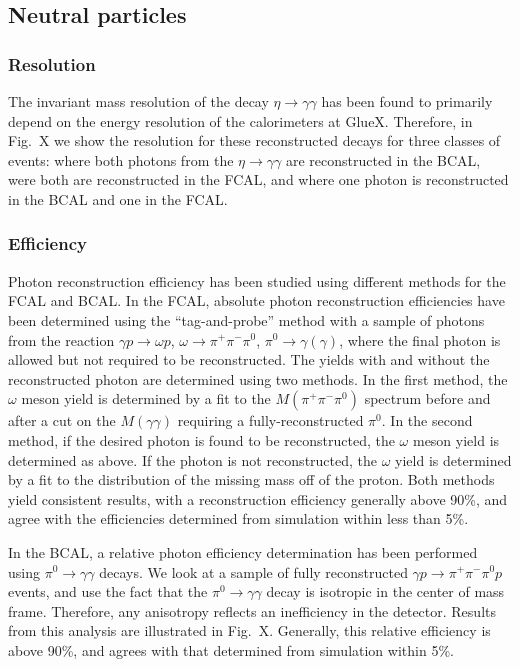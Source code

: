 \subsection{Neutral particles \label{sec:perfneutral}}

\subsubsection{Resolution \label{sec:perfneutralresol}}

The invariant mass resolution of the decay $\eta \to \gamma \gamma$ has been found to primarily depend on the energy resolution of the calorimeters at GlueX.  Therefore, in Fig.~X we show the resolution for these reconstructed decays for three classes of events: where both photons from the  $\eta \to \gamma \gamma$ are reconstructed in the BCAL, were both are reconstructed in the FCAL, and where one photon is reconstructed in the BCAL and one in the FCAL.

\subsubsection{Efficiency \label{sec:perfneutraleff}}

Photon reconstruction efficiency has been studied using different methods for the FCAL and BCAL.  In the FCAL, absolute photon reconstruction efficiencies have been determined using the ``tag-and-probe'' method with a sample of photons from the reaction $\gamma p \to \omega p$, $\omega \to \pi^+\pi^-\pi^0$, $\pi^0 \to \gamma (\gamma)$, where the final photon is allowed but not required to be reconstructed.  The yields with and without the reconstructed photon are determined using two methods.  In the first method, the $\omega$ meson yield is determined by a fit to the $M(\pi^+\pi^-\pi^0)$ spectrum before and after a cut on the $M(\gamma\gamma)$ requiring a fully-reconstructed $\pi^0$.  In the second method, if the desired photon is found to be reconstructed, the  $\omega$ meson yield is determined as above.  If the photon is not reconstructed, the $\omega$ yield is determined by a fit to the distribution of the missing mass off of the proton.
Both methods yield consistent results, with a reconstruction efficiency generally above 90\%, and agree with the efficiencies determined from simulation within less than 5\%.

In the BCAL, a relative photon efficiency determination has been performed using $\pi^0\to\gamma\gamma$ decays.  We look at a sample of fully reconstructed $\gamma p \to  \pi^+\pi^-\pi^0 p$ events, and use the fact that the $\pi^0\to\gamma\gamma$ decay is isotropic in the center of mass frame.  Therefore, any anisotropy reflects an inefficiency in the detector. Results from this analysis are illustrated in Fig.~X. Generally, this relative efficiency is above 90\%, and agrees with that determined from simulation within 5\%.

